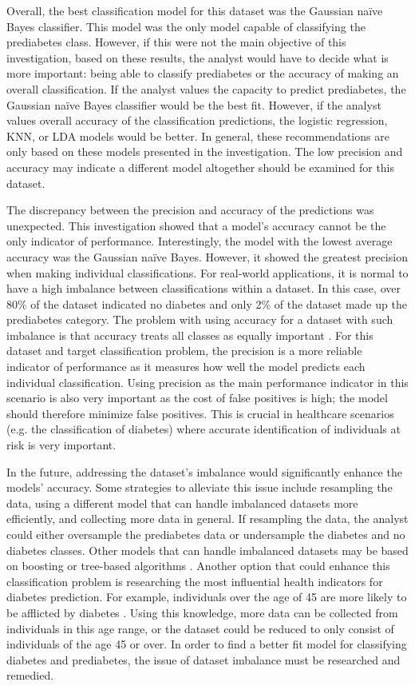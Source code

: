 \documentclass[journal]{IEEEtran}
\begin{document}
Overall, the best classification model for this dataset was the Gaussian naïve Bayes classifier. This model was the only model capable of classifying the prediabetes class. However, if this were not the main objective of this investigation, based on these results, the analyst would have to decide what is more important: being able to classify prediabetes or the accuracy of making an overall classification. If the analyst values the capacity to predict prediabetes, the Gaussian naïve Bayes classifier would be the best fit. However, if the analyst values overall accuracy of the classification predictions, the logistic regression, KNN, or LDA models would be better. In general, these recommendations are only based on these models presented in the investigation. The low precision and accuracy may indicate a different model altogether should be examined for this dataset. 

The discrepancy between the precision and accuracy of the predictions was unexpected. This investigation showed that a model's accuracy cannot be the only indicator of performance. Interestingly, the model with the lowest average accuracy was the Gaussian naïve Bayes. However, it showed the greatest precision when making individual classifications. For real-world applications, it is normal to have a high imbalance between classifications within a dataset. In this case, over 80\% of the dataset indicated no diabetes and only 2\% of the dataset made up the prediabetes category. The problem with using accuracy for a dataset with such imbalance is that accuracy treats all classes as equally important \cite{b13}. For this dataset and target classification problem, the precision is a more reliable indicator of performance as it measures how well the model predicts each individual classification. Using precision as the main performance indicator in this scenario is also very important as the cost of false positives is high; the model should therefore minimize false positives. This is crucial in healthcare scenarios (e.g. the classification of diabetes) where accurate identification of individuals at risk is very important.

In the future, addressing the dataset's imbalance would significantly enhance the models' accuracy. Some strategies to alleviate this issue include resampling the data, using a different model that can handle imbalanced datasets more efficiently, and collecting more data in general. If resampling the data, the analyst could either oversample the prediabetes data or undersample the diabetes and no diabetes classes. Other models that can handle imbalanced datasets may be based on boosting or tree-based algorithms \cite{b14}. Another option that could enhance this classification problem is researching the most influential health indicators for diabetes prediction. For example, individuals over the age of 45 are more likely to be afflicted by diabetes \cite{b1}. Using this knowledge, more data can be collected from individuals in this age range, or the dataset could be reduced to only consist of individuals of the age 45 or over. In order to find a better fit model for classifying diabetes and prediabetes, the issue of dataset imbalance must be researched and remedied. 
\end{document}
